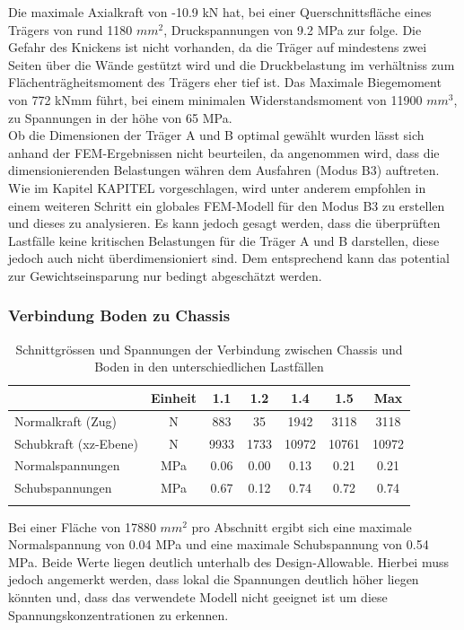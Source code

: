 Die maximale Axialkraft von -10.9 kN hat, bei einer Querschnittsfläche eines Trägers von rund 1180 $mm^2$, Druckspannungen von 9.2 MPa zur folge. Die Gefahr des Knickens ist nicht vorhanden, da die Träger auf mindestens zwei Seiten über die Wände gestützt wird und die Druckbelastung im verhältniss zum Flächenträgheitsmoment des Trägers eher tief ist. Das Maximale Biegemoment von 772 kNmm führt, bei einem minimalen Widerstandsmoment von 11900 $mm^3$, zu Spannungen in der höhe von 65 MPa.\\
Ob die Dimensionen der Träger A und B optimal gewählt wurden lässt sich anhand der FEM-Ergebnissen nicht beurteilen, da angenommen wird, dass die dimensionierenden Belastungen währen dem Ausfahren (Modus B3) auftreten. Wie im Kapitel KAPITEL vorgeschlagen, wird unter anderem empfohlen in einem weiteren Schritt ein globales FEM-Modell für den Modus B3 zu erstellen und dieses zu analysieren. Es kann jedoch gesagt werden, dass die überprüften Lastfälle keine kritischen Belastungen für die Träger A und B darstellen, diese jedoch auch nicht überdimensioniert sind. Dem entsprechend kann das potential zur Gewichtseinsparung nur bedingt abgeschätzt werden.



\subsubsection{Verbindung Boden zu Chassis}

\begin{table}[H]
\centering
\begin{tabular}{lcccccc}
\thickhline
&	Einheit	&	1.1	&	1.2	&	1.4	&	1.5	&	Max	\\	\hline
Normalkraft (Zug)	&	N	&	883	&	35	&	1942	&	3118	&	3118	\\
Schubkraft (xz-Ebene)	&	N	&	9933	&	1733	&	10972	&	10761	&	10972	\\	\hline
Normalspannungen	&	MPa	&	0.06	&	0.00	&	0.13	&	0.21	&	0.21	\\
Schubspannungen	&	MPa	&	0.67	&	0.12	&	0.74	&	0.72	&	0.74	\\	\thickhline
\end{tabular}
\caption{Schnittgrössen und Spannungen der Verbindung zwischen Chassis und Boden in den unterschiedlichen Lastfällen}
\label{tab:FEMres Boden}
\end{table}

Bei einer Fläche von 17880 $mm^2$ pro Abschnitt ergibt sich eine maximale Normalspannung von 0.04 MPa und eine maximale Schubspannung von 0.54 MPa. Beide Werte liegen deutlich unterhalb des Design-Allowable. Hierbei muss jedoch angemerkt werden, dass lokal die Spannungen deutlich höher liegen könnten und, dass das verwendete Modell nicht geeignet ist um diese Spannungskonzentrationen zu erkennen.

